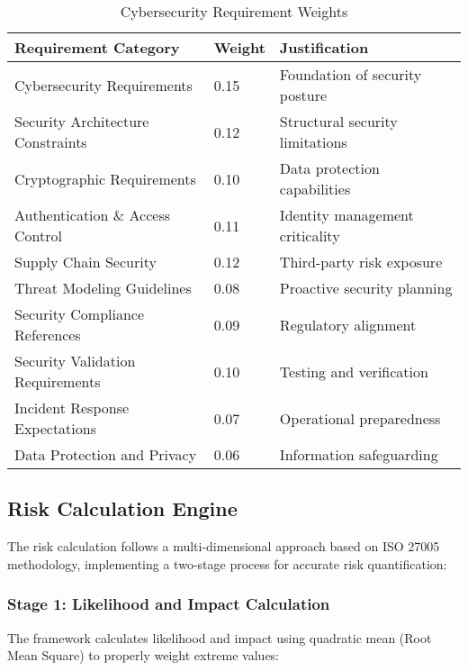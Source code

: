 \documentclass[binding=0.6cm]{sapthesis}
\begin{document}
\begin{table}[H]
\centering
\caption{Cybersecurity Requirement Weights}
\begin{tabular}{|l|l|l|}
\hline
\textbf{Requirement Category} & \textbf{Weight} & \textbf{Justification} \\ \hline
Cybersecurity Requirements & 0.15 & Foundation of security posture \\ \hline
Security Architecture Constraints & 0.12 & Structural security limitations \\ \hline
Cryptographic Requirements & 0.10 & Data protection capabilities \\ \hline
Authentication \& Access Control & 0.11 & Identity management criticality \\ \hline
Supply Chain Security & 0.12 & Third-party risk exposure \\ \hline
Threat Modeling Guidelines & 0.08 & Proactive security planning \\ \hline
Security Compliance References & 0.09 & Regulatory alignment \\ \hline
Security Validation Requirements & 0.10 & Testing and verification \\ \hline
Incident Response Expectations & 0.07 & Operational preparedness \\ \hline
Data Protection and Privacy & 0.06 & Information safeguarding \\ \hline
\end{tabular}
\end{table}

\subsection{Risk Calculation Engine}

The risk calculation follows a multi-dimensional approach based on ISO 27005 methodology, implementing a two-stage process for accurate risk quantification:

\subsubsection{Stage 1: Likelihood and Impact Calculation}

The framework calculates likelihood and impact using quadratic mean (Root Mean Square) to properly weight extreme values:
\end{document}
